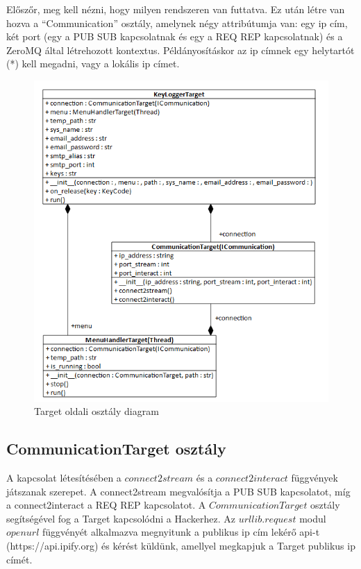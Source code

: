 \documentclass[12pt,a4paper,oneside]{report}
\begin{document}
Előszőr, meg kell nézni, hogy milyen rendszeren van futtatva. Ez után létre van hozva a ``Communication'' osztály, amelynek négy attribútumja van: egy ip cím, két port (egy a PUB SUB kapcsolatnak és egy a REQ REP kapcsolatnak) és a ZeroMQ által létrehozott kontextus. Példányosításkor az ip címnek egy helytartót (*) kell megadni, vagy a lokális ip címet.
\begin{figure}[H]
\centering
\includegraphics[width=400pt]{../images/targetclassdiagram}
\caption{Target oldali osztály diagram}
\label{fig:clientclassdia}
\end{figure}

\subsection{CommunicationTarget osztály}\label{subsubsec:clinetclass}
A kapcsolat létesítésében a $connect2stream$ és a $connect2interact$ függvények játszanak szerepet. A connect2stream megvalósítja a PUB SUB kapcsolatot, míg a connect2interact a REQ REP kapcsolatot. A $CommunicationTarget$ osztály segítségével fog a Target kapcsolódni a Hackerhez. Az $urllib.request$ modul $openurl$ függvényét alkalmazva megnyitunk a publikus ip cím lekérő api-t (https://api.ipify.org) és kérést küldünk, amellyel megkapjuk a Target publikus ip címét.
\end{document}
